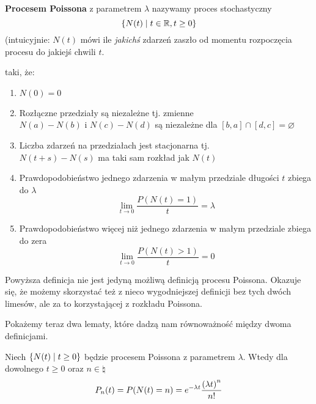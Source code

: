 \begin{definition}
	\label{poisson-process-definition}
	\textbf{Procesem Poissona} z parametrem \( \lambda \) nazywamy proces stochastyczny
	\[ \set{N(t) \mid t \in \real, t \geq 0} \]
	(intuicyjnie: \(N(t)\) mówi ile \textit{jakichś} zdarzeń zaszło od momentu rozpoczęcia procesu do jakiejś chwili \(t\).

	taki, że:

	\begin{enumerate}
		\item \( N(0) = 0 \)

		\item Rozłączne przedziały są niezależne tj. zmienne \\
		      \( N(a) - N(b) \) i \( N(c) - N(d) \) są niezależne dla \( [b, a] \cap [d, c] = \varnothing \)

		\item Liczba zdarzeń na przedziałach jest stacjonarna tj. \\
		      \( N(t + s) - N(s) \) ma taki sam rozkład jak \( N(t) \)

		\item Prawdopodobieństwo jednego zdarzenia w małym przedziale długości \( t \) zbiega do \( \lambda  \) \\
		      \[ \lim_{t \rightarrow 0} \frac{P(N(t) = 1)}{t} = \lambda \]

		\item Prawdopodobieństwo więcej niż jednego zdarzenia w małym przedziale zbiega do zera \\
		      \[ \lim_{t \rightarrow 0} \frac{P(N(t) > 1)}{t} = 0 \]
	\end{enumerate}
\end{definition}


Powyższa definicja nie jest jedyną możliwą definicją procesu Poissona. Okazuje się, że możemy skorzystać też z nieco wygodniejszej definicji bez tych dwóch limesów, ale za to korzystającej z rozkładu Poissona.

Pokażemy teraz dwa lematy, które dadzą nam równoważność między dwoma definicjami.


\begin{theorem}[Twierdzenie 8.7 P\&C]
	Niech \( \set{N(t) \mid t \geq 0} \) będzie procesem Poissona z parametrem \( \lambda \). Wtedy dla dowolnego \( t \geq 0 \) oraz \( n \in \natural \)
	\[
		P_n(t) = P(N(t) = n) = e^{-\lambda t} \frac{\left(\lambda t\right)^n}{n!}
	\]
\end{theorem}

